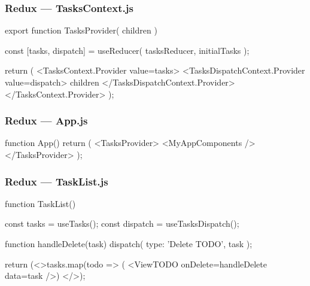 \begin{frame}[fragile] \frametitle{Redux --- TasksContext.js}
\begin{CodeBox}{}
export function TasksProvider({ children }) {
  const [tasks, dispatch] = useReducer(
    tasksReducer,
    initialTasks
  );

  return (
    <TasksContext.Provider value={tasks}>
      <TasksDispatchContext.Provider value={dispatch}>
        {children}
      </TasksDispatchContext.Provider>
    </TasksContext.Provider>
  );
}
\end{CodeBox}
\end{frame}

\begin{frame}[fragile] \frametitle{Redux --- App.js}
\begin{CodeBox}{}
function App() {
  return (
    <TasksProvider>
      <MyAppComponents />
    </TasksProvider>
  );
}
\end{CodeBox}
\end{frame}

\begin{frame}[fragile] \frametitle{Redux --- TaskList.js}
\begin{CodeBox}{}
function TaskList() {
  const tasks = useTasks();
  const dispatch = useTasksDispatch();

  function handleDelete(task){
        dispatch({
            type: 'Delete TODO',
            task
  });}
  
  return (<>tasks.map(todo => (
               <ViewTODO onDelete={handleDelete} data={task} />)
             </>);
}
\end{CodeBox}
\end{frame}
